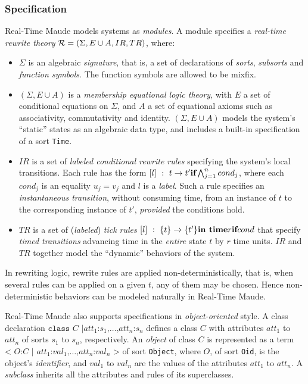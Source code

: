 \documentclass[10pt,journal,compsoc]{IEEEtran}
\begin{document}
\subsubsection{Specification}
Real-Time Maude models systems as \emph{modules}. A module specifies a
\emph{real-time rewrite theory} ${\cal R} = (\Sigma, E\cup A , IR,
TR)$, where:
\begin{itemize}
\item $\Sigma$ is an algebraic \emph{signature}, that is, a set of
  declarations of \emph{sorts}, \emph{subsorts} and \emph{function
    symbols}. The function symbols are allowed to be mixfix.
\item $(\Sigma, E\cup A)$ is a \emph{membership equational logic
  theory}, with $E$ a set of conditional equations on $\Sigma$, and
  $A$ a set of equational axioms such as associativity, commutativity
  and identity.  $(\Sigma, E\cup A)$ models the system's ``static''
  states as an algebraic data type, and includes a built-in
  specification of a sort \verb|Time|.
\item $IR$ is a set of \emph{labeled conditional rewrite rules}
  specifying the system's local transitions. Each rule has the form
  $[l]~:~t\rightarrow t'\mbox{ \textbf{if} }\bigwedge^n_{j=1}cond_j$,
  where each $cond_j$ is an equality $u_j=v_j$ and $l$ is a
  \emph{label}. Such a rule specifies an \emph{instantaneous
    transition}, without consuming time, from an instance of $t$ to
  the corresponding instance of $t'$, \emph{provided} the conditions
  hold.
\item $TR$ is a set of (\emph{labeled}) \emph{tick rules}
  $[l]~:~\{t\}\rightarrow\{t'\} \mbox{ \textbf{in time} }r\mbox{
  \textbf{if} }cond$ that specify \emph{timed transitions} advancing
  time in the \emph{entire} state $t$ by $r$ time units. $IR$ and $TR$
  together model the ``dynamic'' behaviors of the system.
\end{itemize}

In rewriting logic, rewrite rules are applied non-deterministically,
that is, when several rules can be applied on a given $t$, any of them
may be chosen. Hence non-deterministic behaviors can be modeled
naturally in Real-Time Maude.

Real-Time Maude also supports specifications in \emph{object-oriented}
style.  A class declaration $\texttt{class }C\texttt{ |
}att_1\texttt{:}s_1\texttt{,}\ldots\texttt{,}att_n\texttt{:}s_n$
defines a class $C$ with attributes $att_1$ to $att_n$ of sorts $s_1$
to $s_n$, respectively. An \emph{object} of class $C$ is represented
as a term $\texttt{< } O\texttt{:} C \texttt{ | }
att_1\texttt{:}val_1\texttt{,} \ldots
\texttt{,}att_n\texttt{:}val_n\texttt{ >}$ of sort \verb|Object|,
where $O$, of sort \verb|Oid|, is the object's \emph{identifier}, and
$val_1$ to $val_n$ are the values of the attributes $att_1$ to
$att_n$. A \emph{subclass} inherits all the attributes and rules of
its superclasses.
\end{document}
